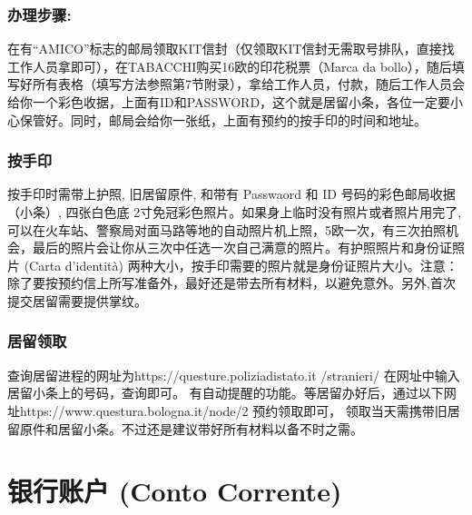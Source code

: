 \subsubsection{办理步骤:}
在有“AMICO”标志的邮局领取KIT信封（仅领取KIT信封无需取号排队，直接找工作人员拿即可），在TABACCHI购买16欧的印花税票（Marca da bollo），随后填写好所有表格（填写方法参照第7节附录），拿给工作人员，付款，随后工作人员会给你一个彩色收据，上面有ID和PASSWORD，这个就是居留小条，各位一定要小心保管好。同时，邮局会给你一张纸，上面有预约的按手印的时间和地址。


\subsubsection{按手印}
按手印时需带上护照, 旧居留原件, 和带有 Passwaord 和 ID 号码的彩色邮局收据（小条）, 四张白色底 2寸免冠彩色照片。如果身上临时没有照片或者照片用完了,可以在火车站、警察局对面马路等地的自动照片机上照，5欧一次，有三次拍照机会，最后的照片会让你从三次中任选一次自己满意的照片。有护照照片和身份证照片 (Carta d’identità)  两种大小，按手印需要的照片就是身份证照片大小。注意：除了要按预约信上所写准备外，最好还是带去所有材料，以避免意外。另外,首次提交居留需要提供掌纹。


\subsubsection{居留领取}
查询居留进程的网址为https://questure.poliziadistato.it /stranieri/ 在网址中输入居留小条上的号码，查询即可。
有自动提醒的功能。等居留办好后，通过以下网址https://www.questura.bologna.it/node/2 预约领取即可，
领取当天需携带旧居留原件和居留小条。不过还是建议带好所有材料以备不时之需。


\section{银行账户 (Conto Corrente)}

